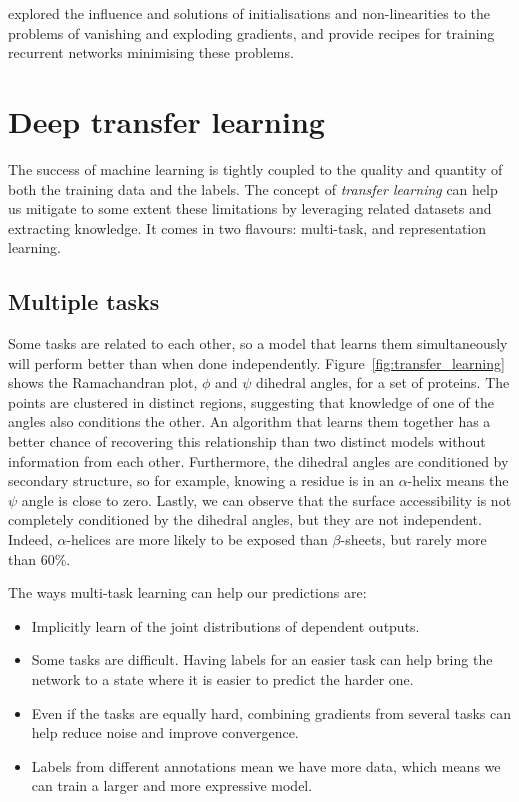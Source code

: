 \citet{difficult_recurrent} explored the influence and solutions of initialisations and non-linearities 
to the problems of vanishing and exploding gradients, and provide recipes for training recurrent networks minimising these problems.


\section{Deep transfer learning}\label{sec:transfer}
The success of machine learning is tightly coupled to the quality and quantity of both the training data and the labels.
The concept of \emph{transfer learning} can help us mitigate to some extent these limitations by leveraging related datasets and extracting knowledge.
It comes in two flavours: multi-task, and representation learning.

\subsection{Multiple tasks}
Some tasks are related to each other, so a model that learns them simultaneously will perform better than when done independently.
Figure~\ref{fig:transfer_learning} shows the Ramachandran plot,  $\phi$ and $\psi$ dihedral angles, for a set of proteins.
The points are clustered in distinct regions, suggesting that knowledge of one of the angles also conditions the other.
An algorithm that learns them together has a better chance of recovering this relationship than two distinct models without information from each other.
Furthermore, the dihedral angles are conditioned by secondary structure, so for example, knowing a residue is in an $\alpha$-helix means the $\psi$ angle is close to zero.
Lastly, we can observe that the surface accessibility is not completely conditioned by the dihedral angles, but they are not independent.
Indeed, $\alpha$-helices are more likely to be exposed than $\beta$-sheets, but rarely more than 60\%.

The ways multi-task learning  can help our predictions are:
\begin{itemize}
	\item Implicitly learn of the joint distributions of dependent outputs.
	\item Some tasks are difficult.
	Having labels for an easier task can help bring the network to a state where it is easier to predict the harder one.
	\item Even if the tasks are equally hard, combining gradients from several tasks can help reduce noise and improve convergence.
	\item Labels from different annotations mean we have more data, which means we can train a larger and more expressive model.
\end{itemize}

